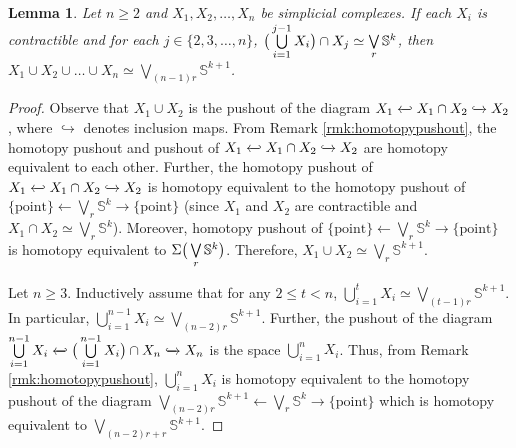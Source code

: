 \documentclass[12pt]{article}
\newtheorem{lem}[thm]{Lemma}
\numberwithin{thm}{section}
\theoremstyle{definition}
\newcommand{\bS}{\mathbb{S}}
\begin{document}
  
  \begin{lem}\label{lem:contractible}
  	Let $n \geq 2$ and $X_1, X_2, \ldots, X_n$ be simplicial complexes. If each $X_i$ is contractible and for each $j \in \{2,3,\ldots, n\}$, $\big{(} \bigcup\limits_{i=1}^{j-1}X_i\big{)} \cap X_j \simeq \bigvee\limits_{r} \bS^{k}$, then $X_1 \cup X_2 \cup  \ldots \cup X_n \simeq \bigvee\limits_{(n-1)r} \bS^{k+1} $.
  \end{lem}
  
  \begin{proof}Observe that $X_1 \cup X_2$ is the pushout of the diagram $X_1\xhookleftarrow{} X_1 \cap X_2 \xhookrightarrow{} X_2$, where $\hookrightarrow$ denotes inclusion maps. From Remark \ref{rmk:homotopypushout}, the homotopy pushout and pushout of $X_1\xhookleftarrow{} X_1 \cap X_2 \xhookrightarrow{} X_2$ are homotopy equivalent to each other. Further, the homotopy pushout of $X_1\xhookleftarrow{} X_1 \cap X_2 \xhookrightarrow{} X_2$ is homotopy equivalent to the homotopy pushout of $\{ \text{point}\}\longleftarrow{} \bigvee\limits_{r} \bS^{k} \longrightarrow{} \{\text{point}\}$ (since $X_1$ and $X_2$ are contractible and $X_1 \cap X_2 \simeq \bigvee\limits_{r} \bS^{k}$). Moreover, homotopy pushout of $\{\text{point}\}\longleftarrow{} \bigvee\limits_{r} \bS^{k} \longrightarrow{} \{\text{point}\}$ is homotopy equivalent to $\Sigma\big{(}\bigvee\limits_{r} \bS^{k}\big{)}$. Therefore, $X_1 \cup X_2 \simeq \bigvee\limits_{r} \bS^{k+1}$.
  
 Let $n \geq 3$. Inductively assume that for any $2 \leq t < n$, $\bigcup\limits_{i=1}^{t}X_i \simeq \bigvee\limits_{(t-1)r} \bS^{k+1}$. 
  In particular, $\bigcup\limits_{i=1}^{n-1}X_i \simeq \bigvee\limits_{(n-2)r} \bS^{k+1}$.
  Further, the pushout of the diagram $\bigcup\limits_{i=1}^{n-1}X_i \xhookleftarrow{} \big{(}\bigcup\limits_{i=1}^{n-1}X_i\big{)} \cap X_n \xhookrightarrow{} X_n$ is the space $\bigcup\limits_{i=1}^{n}X_i$. Thus, from Remark \ref{rmk:homotopypushout}, $\bigcup\limits_{i=1}^{n}X_i$ is homotopy equivalent to the homotopy pushout of the diagram $\bigvee\limits_{(n-2)r} \bS^{k+1} \longleftarrow{} \bigvee\limits_{r} \bS^{k}  \longrightarrow{} \{\text{point}\}$ which is homotopy equivalent to $\bigvee\limits_{(n-2)r+r} \bS^{k+1}$.
  
  
  \end{proof}
\end{document}
